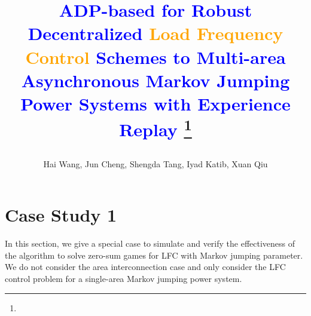 \documentclass[journal]{IEEEtran}
\begin{document}
\title {\textcolor{blue}{ADP-based for Robust Decentralized \textcolor{orange}{Load Frequency Control} Schemes to  Multi-area Asynchronous Markov Jumping Power Systems with Experience Replay}
	\footnote{ }
\author{Hai Wang, Jun Cheng, Shengda Tang, Iyad Katib, Xuan Qiu}%
}
\date{}
\maketitle
\normalsize

\section{Case Study 1}	

In this section, we give a special case to simulate and verify the effectiveness of the algorithm to solve zero-sum games for LFC with Markov jumping parameter. We do not consider the area interconnection case and only consider the LFC control problem for a single-area Markov jumping power system.
\end{document}
